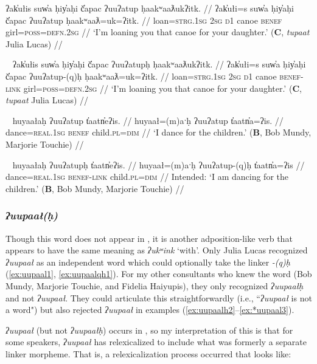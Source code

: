 \ex \label{ex:uatup}
\begingl
\glpreamble ʔak̓ułis suw̓a ḥiy̓aḥi č̓apac ʔuuʔatup ḥaakʷaaƛukʔitk. //
\gla ʔak̓ułi=s suw̓a ḥiy̓aḥi č̓apac ʔuuʔatup ḥaakʷaaƛ=uk=ʔitk. //
\glb loan=\textsc{strg.1sg} \textsc{2sg} \textsc{d1} canoe \textsc{benef} girl=\textsc{poss}=\textsc{defn.2sg} //
\glft `I'm loaning you that canoe for your daughter.' (\textbf{C}, \textit{tupaat} Julia Lucas) //
\endgl
\xe

\ex~ \label{ex:uatuph}
\begingl
\glpreamble ʔak̓ułis suw̓a ḥiy̓aḥi č̓apac ʔuuʔatupḥ ḥaakʷaaƛukʔitk. //
\gla ʔak̓ułi=s suw̓a ḥiy̓aḥi č̓apac ʔuuʔatup-(q)ḥ ḥaakʷaaƛ=uk=ʔitk. //
\glb loan=\textsc{strg.1sg} \textsc{2sg} \textsc{d1} canoe \textsc{benef}-\textsc{link} girl=\textsc{poss}=\textsc{defn.2sg} //
\glft `I'm loaning you that canoe for your daughter.' (\textbf{C}, \textit{tupaat} Julia Lucas) //
\endgl
\xe

\ex~ \label{ex:uatup2}
\begingl
\glpreamble huyaałaḥ ʔuuʔatup t̓aatn̓eʔis. //
\gla huyaał=(m)aˑḥ ʔuuʔatup t̓aatn̓a=ʔis. //
\glb dance=\textsc{real.1sg} \textsc{benef} child.\textsc{pl}=\textsc{dim} //
\glft `I dance for the children.' (\textbf{B}, Bob Mundy, Marjorie Touchie) //
\endgl
\xe

\ex~ \label{ex:uatuph2}
\begingl
\glpreamble *huyaałaḥ ʔuuʔatupḥ t̓aatn̓eʔis. //
\gla huyaał=(m)aˑḥ ʔuuʔatup-(q)ḥ t̓aatn̓a=ʔis //
\glb dance=\textsc{real.1sg} \textsc{benef}-\textsc{link} child.\textsc{pl}=\textsc{dim} //
\glft Intended: `I am dancing for the children.' (\textbf{B}, Bob Mundy, Marjorie Touchie) //
\endgl
\xe

\subsubsection{\textit{ʔuupaał(ḥ)}} Though this word does not appear in \citet{woo2007b}, it is another adposition-like verb that appears to have the same meaning as \textit{ʔukʷink} `with'. Only Julia Lucas recognized \textit{ʔuupaał} as an independent word which could optionally take the linker \textit{-(q)ḥ} (\ref{ex:uupaal1}, \ref{ex:uupaalqh1}). For my other consultants who knew the word (Bob Mundy, Marjorie Touchie, and Fidelia Haiyupis), they only recognized \textit{ʔuupaałḥ} and not \textit{ʔuupaał}. They could articulate this straightforwardly (i.e., ``\textit{ʔuupaał} is not a word") but also rejected \textit{ʔuupaał} in examples (\ref{ex:uupaalh2}--\ref{ex:*uupaal3}).

\textit{ʔuupaał} (but not \textit{ʔuupaałḥ}) occurs in \citet{sapir1939, sapir1955}, so my interpretation of this is that for some speakers, \textit{ʔuupaał} has relexicalized to include what was formerly a separate linker morpheme. That is, a relexicalization process occurred that looks like:


